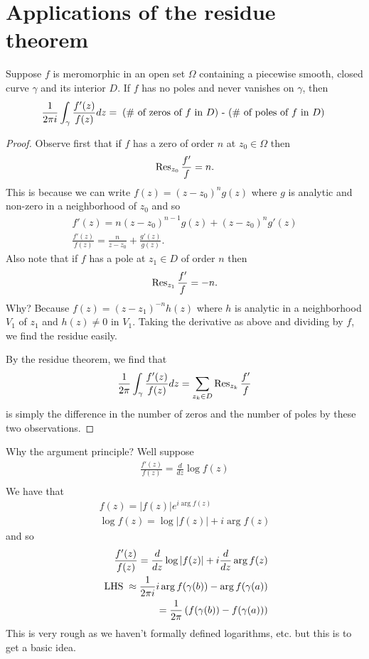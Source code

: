 \section{Applications of the residue theorem}

\begin{thm}
   Suppose $f$ is meromorphic in an open set $\Omega$ containing a piecewise smooth, closed curve $\gamma$ and its interior $D$. 
   If $f$ has no poles and never vanishes on $\gamma$, then
   \begin{align*}
       \frac{1}{2\pi i}\int_\gamma \frac{f'(z)}{f(z)}dz=\;\textnormal{(\# of zeros of $f$ in $D$) - (\# of poles of $f$ in $D$)}\;
   \end{align*}
\end{thm}
\begin{proof}
    Observe first that if $f$ has a zero of order $n$ at $z_0\in\Omega$ then
    \[\operatorname{Res}_{z_0}\frac{f'}{f}=n.\]
    This is because we can write $f(z)=(z-z_0)^ng(z)$ where $g$ is analytic and non-zero in a neighborhood of $z_0$ and so
    \begin{align*}
        f'(z)=n(z-z_0)^{n-1}g(z)+(z-z_0)^ng'(z)\\
        \frac{f'(z)}{f(z)}=\frac{n}{z-z_0}+\frac{g'(z)}{g(z)}.
    \end{align*}
    Also note that if $f$ has a pole at $z_1\in D$ of order $n$ then
    \[\operatorname{Res}_{z_1}\frac{f'}{f}=-n.\]
    Why? Because $f(z)=(z-z_1)^{-n}h(z)$ where $h$ is analytic in a neighborhood $V_1$ of $z_1$ and $h(z)\neq0$ in $V_1$. Taking the derivative as above and dividing by
    $f$, we find the residue easily.

    By the residue theorem, we find that
    \begin{align*}
        \frac{1}{2\pi}\int_\gamma \frac{f'(z)}{f(z)}dz=\sum_{z_k\in D} \operatorname{Res}_{z_k}\frac{f'}{f}
    \end{align*}
    is simply the difference in the number of zeros and the number of poles by these two observations.
\end{proof}

Why the argument principle? Well suppose
\begin{align*}
    \frac{f'(z)}{f(z)}=\frac{d}{dz}\log f(z)\\
\end{align*}
We have that 
\begin{align*}
    f(z)=|f(z)|e^{i\arg f(z) }\\
    \log f(z)=\log|f(z)|+i\arg f(z)
\end{align*}
and so
\begin{align*}
    \frac{f'(z)}{f(z)}=\frac{d}{dz}\log |f(z)| + i \frac{d}{dz}\arg f(z)\\
    \;\textnormal{LHS}\;\approx \frac{1}{2\pi i} i \arg f(\gamma(b))-\arg f(\gamma(a))\\
    =\frac{1}{2\pi}\left( f(\gamma(b))-f(\gamma(a)) \right)
\end{align*}
This is very rough as we haven't formally defined logarithms, etc. but this is to get a basic idea.

